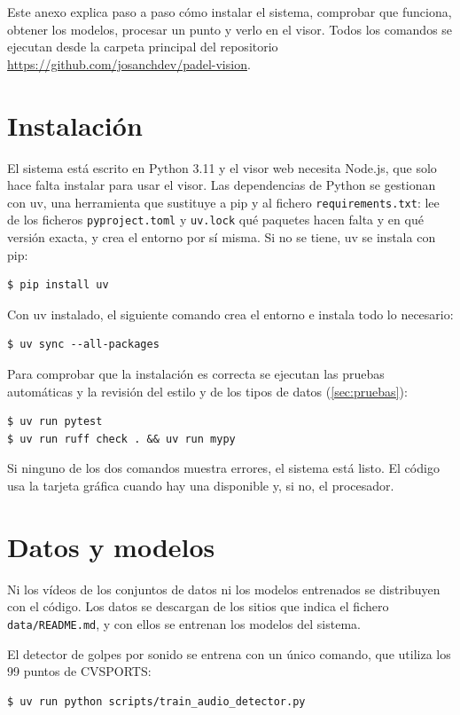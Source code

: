 
Este anexo explica paso a paso cómo instalar el sistema, comprobar que funciona, obtener los modelos, procesar un punto y verlo en el visor.
Todos los comandos se ejecutan desde la carpeta principal del repositorio \url{https://github.com/josanchdev/padel-vision}.

\section{Instalación}

El sistema está escrito en Python 3.11 y el visor web necesita Node.js, que solo hace falta instalar para usar el visor.
Las dependencias de Python se gestionan con uv, una herramienta que sustituye a pip y al fichero \texttt{requirements.txt}: lee de los ficheros \texttt{pyproject.toml} y \texttt{uv.lock} qué paquetes hacen falta y en qué versión exacta, y crea el entorno por sí misma.
Si no se tiene, uv se instala con pip:
\begin{lstlisting}[style=terminal]
$ pip install uv
\end{lstlisting}

Con uv instalado, el siguiente comando crea el entorno e instala todo lo necesario:
\begin{lstlisting}[style=terminal]
$ uv sync --all-packages
\end{lstlisting}

Para comprobar que la instalación es correcta se ejecutan las pruebas automáticas y la revisión del estilo y de los tipos de datos (\cref{sec:pruebas}):
\begin{lstlisting}[style=terminal]
$ uv run pytest
$ uv run ruff check . && uv run mypy
\end{lstlisting}
Si ninguno de los dos comandos muestra errores, el sistema está listo.
El código usa la tarjeta gráfica cuando hay una disponible y, si no, el procesador.

\section{Datos y modelos}

Ni los vídeos de los conjuntos de datos ni los modelos entrenados se distribuyen con el código.
Los datos se descargan de los sitios que indica el fichero \texttt{data/README.md}, y con ellos se entrenan los modelos del sistema.

El detector de golpes por sonido se entrena con un único comando, que utiliza los 99 puntos de CVSPORTS:
\begin{lstlisting}[style=terminal]
$ uv run python scripts/train_audio_detector.py
\end{lstlisting}

